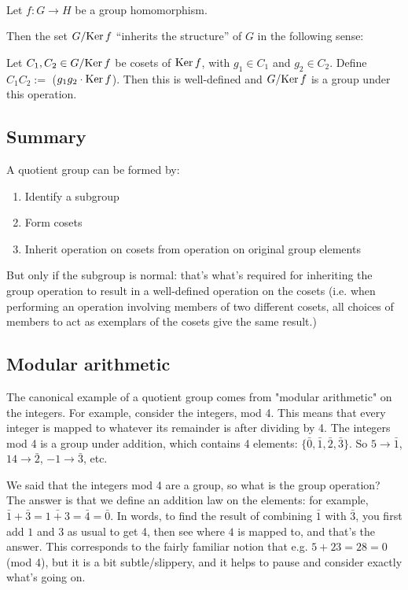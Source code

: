 \begin{theorem}~\\
  Let $f:G \to H$ be a group homomorphism.

  Then the set $G/{\operatorname{\mathrm{Ker}} f}$ ``inherits the structure'' of $G$ in the following sense:

  Let $C_1, C_2 \in G/{\operatorname{\mathrm{Ker}} f}$ be cosets of $\operatorname{\mathrm{Ker}} f$, with $g_1 \in C_1$ and $g_2 \in C_2$. Define
  $C_1C_2 := $ ($g_1g_2\cdot \operatorname{\mathrm{Ker}} f$). Then this is well-defined and $G/{\operatorname{\mathrm{Ker}} f}$ is a group under
  this operation.

\end{theorem}




\subsection{Summary}
A quotient group can be formed by:
\begin{enumerate}
\item Identify a subgroup
\item Form cosets
\item Inherit operation on cosets from operation on original group elements
\end{enumerate}
But only if the subgroup is normal: that's what's required for inheriting the group operation to
result in a well-defined operation on the cosets (i.e. when performing an operation involving
members of two different cosets, all choices of members to act as exemplars of the cosets give the
same result.)

\subsection{Modular arithmetic}

The canonical example of a quotient group comes from "modular arithmetic" on the integers. For
example, consider the integers, mod 4. This means that every integer is mapped to whatever its
remainder is after dividing by 4. The integers mod 4 is a group under addition, which contains 4
elements: $\{\bar 0, \bar 1, \bar 2, \bar 3\}$.
So $5 \rightarrow \bar 1$, $14 \rightarrow \bar 2$, $-1 \rightarrow \bar 3$, etc.

We said that the integers mod 4 are a group, so what is the group operation?
The answer is that we define an addition law on the elements: for example,
$\bar 1 + \bar 3 = \bar{1 + 3} = \bar 4 = \bar 0$. In words, to find the result
of combining $\bar 1$ with $\bar 3$, you first add $1$ and $3$ as usual to get
4, then see where $4$ is mapped to, and that's the answer. This corresponds to
the fairly familiar notion that e.g. $5 + 23 = 28 = 0$ (mod 4), but it is a bit
subtle/slippery, and it helps to pause and consider exactly what's going on.

